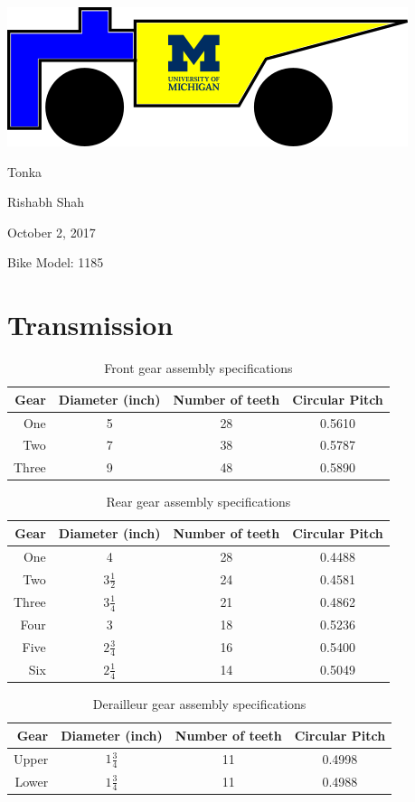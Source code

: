 \documentclass[11pt]{article}
\begin{document}
{\large\noindent \includegraphics{Logo}

\noindent Tonka

\noindent Rishabh Shah

\noindent October 2, 2017

\noindent Bike Model: 1185}

\section*{Transmission}
\begin{table}[H]
	\centering
	\begin{tabular}{|r|c|c|c|}
		\hline
		\textbf{Gear} & \textbf{Diameter (inch)} & \textbf{Number of teeth} & \textbf{Circular Pitch}\\
		\hline
		One & 5 & 28 & 0.5610 \\
		\hline
		Two & 7 & 38 & 0.5787 \\
		\hline
		Three & 9 & 48 & 0.5890 \\
		\hline
	\end{tabular}
	\caption{Front gear assembly specifications}
\end{table}
\begin{table}[H]
	\centering
	\begin{tabular}{|r|c|c|c|}
		\hline
		\textbf{Gear} & \textbf{Diameter (inch)} & \textbf{Number of teeth} & \textbf{Circular Pitch} \\
		\hline
		One & 4 & 28 & 0.4488 \\
		\hline
		Two & \(3\frac{1}{2}\) & 24 & 0.4581 \\
		\hline
		Three & \(3\frac{1}{4}\) & 21 & 0.4862 \\
		\hline
		Four & 3 & 18 & 0.5236 \\
		\hline
		Five & \(2\frac{3}{4}\) & 16 & 0.5400 \\
		\hline
		Six & \(2\frac{1}{4}\) & 14 & 0.5049 \\
		\hline
	\end{tabular}
	\caption{Rear gear assembly specifications}
\end{table}
\begin{table}[H]
	\centering
	\begin{tabular}{|r|c|c|c|}
		\hline
		\textbf{Gear} & \textbf{Diameter (inch)} & \textbf{Number of teeth} & \textbf{Circular Pitch} \\
		\hline
		Upper & \(1\frac{3}{4}\) & 11 & 0.4998 \\
		\hline
		Lower & \(1\frac{3}{4}\) & 11 & 0.4988 \\
		\hline
	\end{tabular}
	\caption{Derailleur gear assembly specifications}
\end{table}
\end{document}
